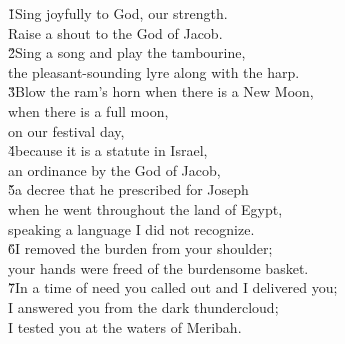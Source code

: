 \begin{poetry}
\poeml \v{1}Sing joyfully to God, our strength. \\
\poemll    Raise a shout to the God of Jacob. \\
\poeml \v{2}Sing a song and play the tambourine, \\
\poemll    the pleasant-sounding lyre along with the harp. \\
\poeml \v{3}Blow the ram's horn when there is a New Moon, \\
\poemll    when there is a full moon, \\
\poemlll       on our festival day, \\
\poeml \v{4}because it is a statute in Israel, \\
\poemll    an ordinance by the God of Jacob, \\
\poeml \v{5}a decree that he prescribed for Joseph \\
\poemll    when he went throughout the land of Egypt, \\
\poemlll       speaking a language I did not recognize. \\
\poeml \v{6}I removed the burden from your shoulder; \\
\poemll    your hands were freed of the burdensome basket. \\
\poeml \v{7}In a time of need you called out and I delivered you; \\
\poemll    I answered you from the dark thundercloud; \\
\poemlll       I tested you at the waters of Meribah.
\end{poetry}

